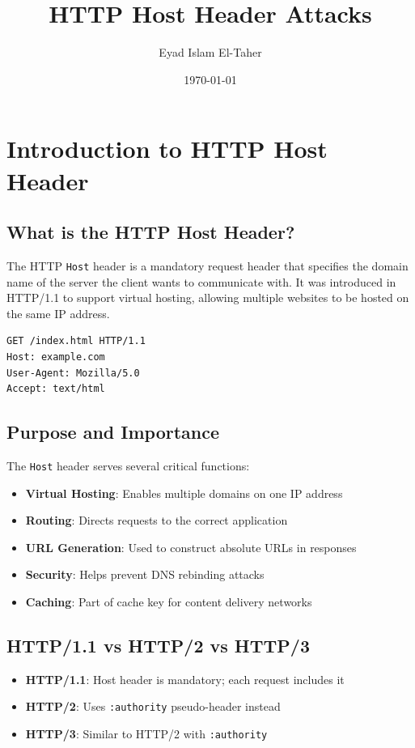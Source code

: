 \documentclass[12pt,a4paper]{article}
\title{
    \vspace{2cm}
    \Huge\textbf{HTTP Host Header Attacks} \\
    \vspace{1.5cm}
}
\author{Eyad Islam El-Taher}
\date{\today}
\begin{document}
\maketitle
\tableofcontents
\newpage

\section{Introduction to HTTP Host Header}

\subsection{What is the HTTP Host Header?}
The HTTP \texttt{Host} header is a mandatory request header that specifies the domain name of the server the client wants to communicate with. It was introduced in HTTP/1.1 to support virtual hosting, allowing multiple websites to be hosted on the same IP address.

\begin{lstlisting}[caption=Basic HTTP Host Header Example]
GET /index.html HTTP/1.1
Host: example.com
User-Agent: Mozilla/5.0
Accept: text/html
\end{lstlisting}

\subsection{Purpose and Importance}
The \texttt{Host} header serves several critical functions:
\begin{itemize}
    \item \textbf{Virtual Hosting}: Enables multiple domains on one IP address
    \item \textbf{Routing}: Directs requests to the correct application
    \item \textbf{URL Generation}: Used to construct absolute URLs in responses
    \item \textbf{Security}: Helps prevent DNS rebinding attacks
    \item \textbf{Caching}: Part of cache key for content delivery networks
\end{itemize}

\subsection{HTTP/1.1 vs HTTP/2 vs HTTP/3}
\begin{itemize}
    \item \textbf{HTTP/1.1}: Host header is mandatory; each request includes it
    \item \textbf{HTTP/2}: Uses \texttt{:authority} pseudo-header instead
    \item \textbf{HTTP/3}: Similar to HTTP/2 with \texttt{:authority}
\end{itemize}
\end{document}
